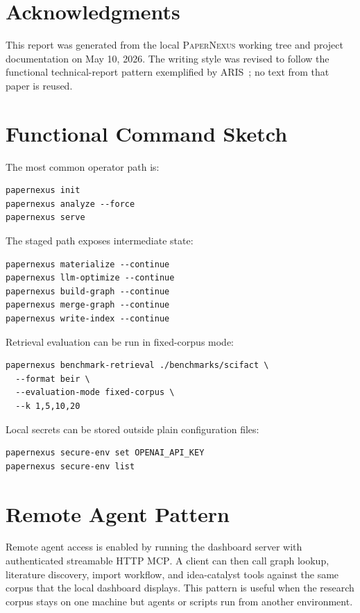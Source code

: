 \documentclass[11pt]{article}
\newcommand{\papernexus}{\textsc{PaperNexus}}
\newcommand{\mcp}{\textsc{MCP}}
\begin{document}
\section*{Acknowledgments}

This report was generated from the local \papernexus{} working tree and project documentation on May 10, 2026. The writing style was revised to follow the functional technical-report pattern exemplified by ARIS~\citep{yang2026aris}; no text from that paper is reused.




\appendix

\section{Functional Command Sketch}

The most common operator path is:

\begin{lstlisting}[style=pncode]
papernexus init
papernexus analyze --force
papernexus serve
\end{lstlisting}

The staged path exposes intermediate state:

\begin{lstlisting}[style=pncode]
papernexus materialize --continue
papernexus llm-optimize --continue
papernexus build-graph --continue
papernexus merge-graph --continue
papernexus write-index --continue
\end{lstlisting}

Retrieval evaluation can be run in fixed-corpus mode:

\begin{lstlisting}[style=pncode]
papernexus benchmark-retrieval ./benchmarks/scifact \
  --format beir \
  --evaluation-mode fixed-corpus \
  --k 1,5,10,20
\end{lstlisting}

Local secrets can be stored outside plain configuration files:

\begin{lstlisting}[style=pncode]
papernexus secure-env set OPENAI_API_KEY
papernexus secure-env list
\end{lstlisting}

\section{Remote Agent Pattern}

Remote agent access is enabled by running the dashboard server with authenticated streamable HTTP \mcp{}. A client can then call graph lookup, literature discovery, import workflow, and idea-catalyst tools against the same corpus that the local dashboard displays. This pattern is useful when the research corpus stays on one machine but agents or scripts run from another environment.
\end{document}
